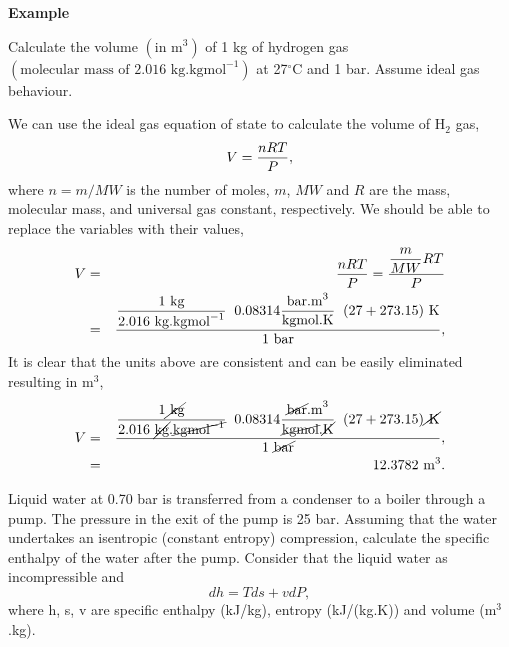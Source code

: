     
  \begin{MyExample}{\begin{center}{\bf Example}\end{center}}
     \begin{example}\label{Chapter:UnitConversion:Example1}
       Calculate the volume $\left(\text{in m}^{3}\right)$ of 1 kg of hydrogen gas $\left(\text{molecular mass of 2.016 kg.kgmol}^{-1}\right)$ at 27$^{\circ}$C and 1 bar. Assume ideal gas behaviour.
     \end{example}

     \noindent We can use the ideal gas equation of state to calculate the volume of H$_{2}$ gas,
           \begin{displaymath}
              V = \displaystyle\frac{nRT}{P},
           \end{displaymath}
           where $n = m/MW$ is the number of moles, $m$, $MW$ and $R$ are the mass, molecular mass, and universal gas constant, respectively. We should be able to replace the variables with their values,
           \begin{eqnarray}
              V &=& \displaystyle\frac{nRT}{P} = \displaystyle\frac{ \displaystyle\frac{m}{MW} R T }{ P } \nonumber \\
                &=& \displaystyle\frac{ \displaystyle\frac{ 1\text{ kg}}{ 2.016\text{ kg.kgmol}^{-1}}\;\; 0.08314\displaystyle\frac{\text{bar.m}^{3}}{\text{kgmol.K}}\;\; ( 27 + 273.15)\text{ K}}{ 1 \text{ bar}},\nonumber
           \end{eqnarray}
           It is clear that the units above are consistent and can be easily eliminated resulting in m$^{3}$,
           \begin{eqnarray}
              V &=& \displaystyle\frac{ \displaystyle\frac{ 1\cancel{\text{ kg}}}{ 2.016\text{ \cancel{kg}.}\cancel{\text{kgmol}^{-1}}}\;\; 0.08314\displaystyle\frac{\text{\cancel{bar}.m}^{3}}{\text{\cancel{kgmol}.\cancel{K}}}\;\; ( 27 + 273.15)\cancel{\text{ K}}}{ 1 \text{ \cancel{bar}}},\nonumber \\
                &=& 12.3782\text{ m}^{3}.\nonumber
           \end{eqnarray}
       \begin{example}\label{Chapter:UnitConversion:Example2}
              Liquid water at 0.70 bar is transferred from a condenser to a boiler through a pump. The pressure in the exit of the pump is 25 bar. Assuming that the water undertakes an isentropic (\ie constant entropy) compression, calculate the specific enthalpy of the water after the pump. Consider that the liquid water as incompressible and
          \begin{displaymath}
            dh = Tds + vdP,
         \end{displaymath}
         where h, s, v are specific enthalpy (kJ/kg), entropy (kJ/(kg.K)) and volume (m$^{3}$.kg).
     \end{example}


\end{MyExample}
